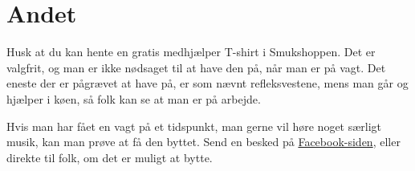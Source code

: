 \section{Andet}
\label{sec:andet}

Husk at du kan hente en gratis medhjælper T-shirt i Smukshoppen. Det er valgfrit, og man 
er ikke nødsaget til at have den på, når man er på vagt. Det eneste der er pågrævet at 
have på, er som nævnt refleksvestene, mens man går og hjælper i køen, så folk kan se at 
man er på arbejde.

Hvis man har fået en vagt på et tidspunkt, man gerne vil høre noget særligt musik, kan man prøve
at få den byttet. Send en besked på 
\href{https://www.facebook.com/groups/522504429506820}{Facebook-siden}, eller direkte til folk, om 
det er muligt at bytte.